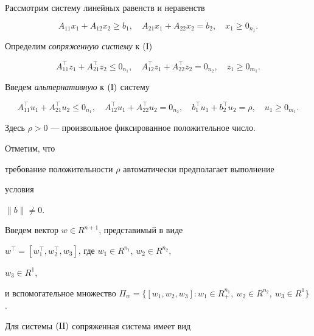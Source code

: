 Рассмотрим систему линейных равенств и неравенств


\begin{equation}


A_{11}x_1+A_{12}x_2\ge b_1,\quad


A_{21}x_1+A_{22}x_2=b_2,\quad x_1\ge 0_{n_1}.\tag{$\I$}


\end{equation}


Определим {\it сопряженную систему} к $(\mathrm I)$


\begin{equation}


A^\top_{11}z_1+A^\top_{21}z_2\le 0_{n_1},\quad


A^\top_{12}z_1+A^\top_{22}z_2=0_{n_2},\quad z_1\ge 0_{m_1}.


\tag{$\I '$}


\end{equation}


Введем {\it альтернативную} к $(\mathrm I)$ систему


\begin{equation}


A^\top_{11}u_1+A^\top_{21}u_2\le 0_{n_1},\quad


A^\top_{12}u_1+A^\top_{22}u_2=0_{n_2},\quad


b^\top_1u_1+b^\top_2u_2=\rho,\quad u_1\ge 0_{m_1}.\tag{$\II$}


\end{equation}


Здесь $\rho>0$ --- произвольное фиксированное положительное число. 


Отметим, что


требование положительности $\rho$ автоматически предполагает выполнение 


условия


$\|b\|\ne0$.





Введем вектор $w\in R^{n+1}$, представимый в виде 


$w^\top=[w^\top_1,w^\top_2,w_3]$, где $w_1\in R^{n_1}$, $w_2\in R^{n_2}$, 


$w_3\in R^1$,


и вспомогательное множество $\Pi_w=\{[w_1,w_2,w_3]:w_1\in R^{n_1}_+,\ 


w_2\in R^{n_2},\ w_3\in R^1\}$.





Для системы $(\mathrm{II})$ сопряженная система имеет вид



